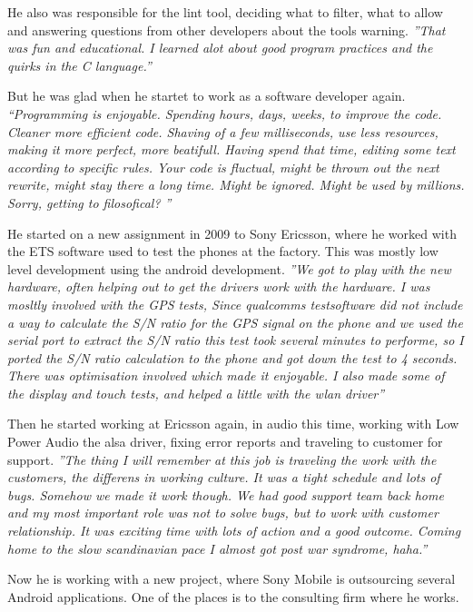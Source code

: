 \documentclass{article}
\begin{document}
\begin{multicols}{3}
{    He also was responsible for the lint tool, deciding what to filter, what 
    to allow and answering questions from other developers about the tools
    warning. \textit{''That was fun and educational. I learned alot about good
    program practices and the quirks in the C language.''}

    But he was glad when he startet to work as a software developer again. 
    \textit{``Programming is enjoyable. Spending hours, days, weeks, to 
    improve the code. Cleaner more efficient code.  Shaving of a few 
    milliseconds, use less resources, making it more perfect, more beatifull.
    Having spend that time, editing some text according to specific rules. 
    Your code is fluctual, might be thrown out the next rewrite,
    might stay there a long time. Might be ignored. Might be used by 
    millions. Sorry, getting to filosofical? ''} 

    He started on a new assignment in 2009 to Sony Ericsson, where he worked
    with the ETS software used to test the phones at the factory. This was 
    mostly low level development using the android development. \textit{''We got
    to play with the new hardware, often helping out to get the drivers work 
    with the hardware. I was mosltly involved with the GPS tests, Since 
    qualcomms testsoftware did not include a way to calculate the S/N ratio for
    the GPS signal on the phone and we used the serial port to extract the S/N
    ratio  this test took several minutes to performe, so I ported the S/N ratio
    calculation to the phone and got down the test to 4 seconds. There was
    optimisation involved which made it enjoyable. I also made some of the
    display and touch tests, and helped a little with the wlan driver''}

    Then he started working at Ericsson again, in audio this time, working with
    Low Power Audio the alsa driver, fixing error reports and traveling to
    customer for support. \textit{''The thing I will remember at this job is 
    traveling the work with the customers, the differens in working culture. 
    It was a tight schedule and lots of bugs. Somehow we made it work though. We
    had good support team back home and my most important role was not to solve 
    bugs, but to work with customer relationship. It was exciting time with lots
    of action and a good outcome. Coming home to the slow scandinavian pace I
    almost got post war syndrome, haha.''}

    Now he is working with a new project, where Sony Mobile is outsourcing
    several Android applications. One of the places is to the consulting firm
    where he works. 

}

\end{multicols}
\end{document}
